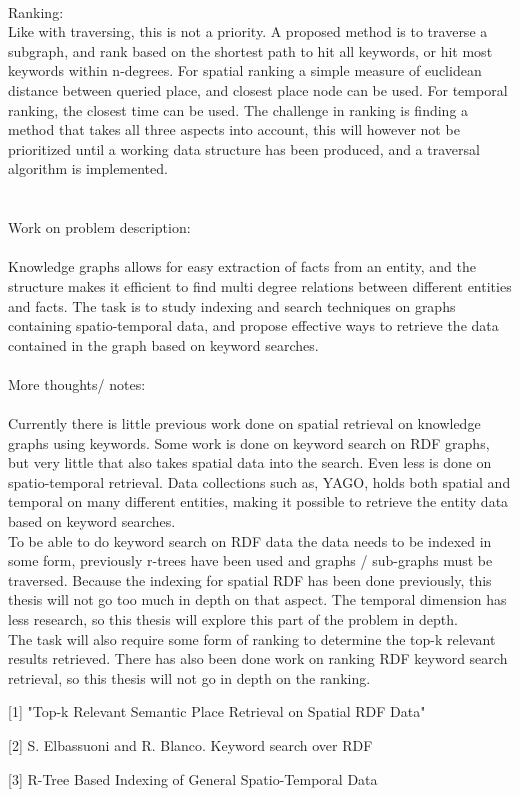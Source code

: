 \\
Ranking:\\
Like with traversing, this is not a priority. A proposed method is to traverse a subgraph, and rank based on the shortest path to hit all keywords, or hit most keywords within n-degrees. For spatial ranking a simple measure of euclidean distance between queried place, and closest place node can be used. For temporal ranking, the closest time can be used. The challenge in ranking is finding a method that takes all three aspects into account, this will however not be prioritized until a working data structure has been produced, and a traversal algorithm is implemented.\\
\\
\\
Work on problem description:\\
\\
Knowledge graphs allows for easy extraction of facts from an entity, and the structure makes it efficient to find multi degree relations between different entities and facts. The task is to study indexing and search techniques on graphs containing spatio-temporal data, and propose effective ways to retrieve the data contained in the graph based on keyword searches.
\\
\\
More thoughts/ notes:\\
\\
Currently there is little previous work done on spatial retrieval on knowledge graphs using keywords. Some work is done on keyword search on RDF graphs, but very little that also takes spatial data into the search. Even less is done on spatio-temporal retrieval. Data collections such as, YAGO, holds both spatial and temporal on many different entities, making it possible to retrieve the entity data based on keyword searches.
\\
To be able to do keyword search on RDF data the data needs to be indexed in some form, previously r-trees have been used and graphs / sub-graphs must be traversed. Because the indexing for spatial RDF has been done previously, this thesis will not go too much in depth on that aspect. The temporal dimension has less research, so this thesis will explore this part of the problem in depth.
\\
The task will also require some form of ranking to determine the top-k relevant results retrieved. There has also been done work on ranking RDF keyword search retrieval, so this thesis will not go in depth on the ranking. %


[1]
"Top-k Relevant Semantic Place Retrieval on Spatial RDF Data"

[2]
S. Elbassuoni and R. Blanco. Keyword search over RDF

[3]
R-Tree Based Indexing of General Spatio-Temporal Data


\clearpage
